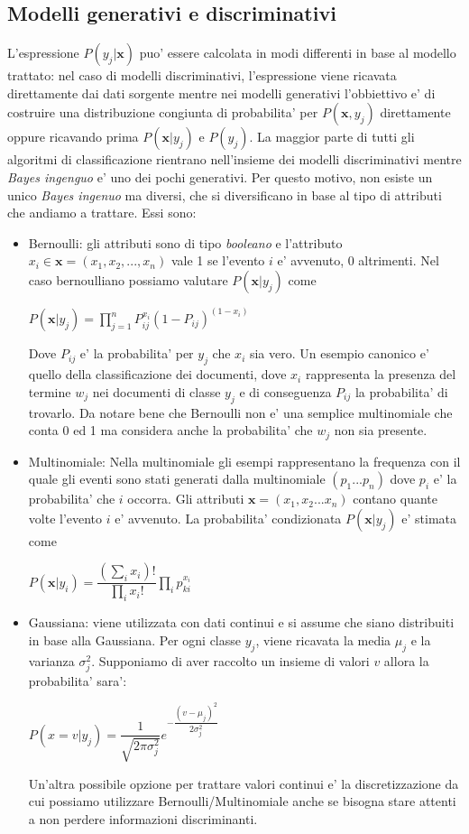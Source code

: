 \subsection*{Modelli generativi e discriminativi}
L'espressione $P(y_j|\textbf{x})$ puo' essere calcolata in modi differenti in base al modello trattato: nel caso di modelli discriminativi, l'espressione viene ricavata direttamente dai dati sorgente mentre nei modelli generativi l'obbiettivo e' di costruire una distribuzione congiunta di probabilita' per $P(\textbf{x}, y_j)$ direttamente oppure ricavando prima $P(\textbf{x}| y_j)$ e $P(y_j)$. La maggior parte di tutti gli algoritmi di classificazione rientrano nell'insieme dei modelli discriminativi mentre \textit{Bayes ingenguo} e' uno dei pochi generativi. Per questo motivo, non esiste un unico \textit{Bayes ingenuo} ma diversi, che si diversificano in base al tipo di attributi che andiamo a trattare. Essi sono:
\begin{itemize}
	\item Bernoulli: gli attributi sono di tipo \textit{booleano} e l'attributo $x_i \in \textbf{x}=(x_1,x_2,...,x_n)$ vale 1 se l'evento $i$ e' avvenuto, 0 altrimenti. Nel caso bernoulliano possiamo valutare $P(\textbf{x}|y_j)$ come
	\begin{center}
	 $P(\textbf{x}|y_j) = \prod_{j=1}^{n} P_{ij}^{x_i} (1-P_{ij})^{(1-x_i)}$
	\end{center}
	Dove $P_{ij}$ e' la probabilita' per $y_j$ che $x_i$ sia vero. Un esempio canonico e' quello della classificazione dei documenti, dove $x_i$ rappresenta la presenza del termine $w_j$ nei documenti di classe $y_j$ e di conseguenza $P_{ij}$ la probabilita' di trovarlo. Da notare bene che Bernoulli non e' una semplice multinomiale che conta 0 ed 1 ma considera anche la probabilita' che $w_j$ non sia presente.
	

	\item Multinomiale: Nella multinomiale gli esempi rappresentano la frequenza con il quale gli eventi sono stati generati dalla multinomiale $(p_1...p_n)$ dove $p_i$ e' la probabilita' che $i$ occorra. Gli attributi $\textbf{x}=(x_1,x_2...x_n)$ contano quante volte l'evento $i$ e' avvenuto. La probabilita' condizionata  $P(\textbf{x}|y_j)$ e' stimata come
	\begin{center}
		$P(\textbf{x}|y_i) = \dfrac{(\sum_{i}x_i)!}{\prod_{i}x_i!}\prod_i p_{ki}^{x_i}$
	\end{center}
	\item Gaussiana: viene utilizzata con dati continui e si assume che siano distribuiti in base alla Gaussiana. Per ogni classe $y_j$, viene ricavata la media $\mu_j$ e la varianza $\sigma_{j}^{2}$. Supponiamo di aver raccolto un insieme di valori $v$ allora la probabilita' sara':
	\begin{center}
		$P(x =v | y_j) = \dfrac{1}{\sqrt{2 \pi \sigma_{j}^2}} e^{-\dfrac{(v - \mu_j)^2}{2 \sigma_{j}^2}}$
	\end{center}
	Un'altra possibile opzione per trattare valori continui e' la discretizzazione da cui possiamo utilizzare Bernoulli/Multinomiale anche se bisogna stare attenti a non perdere informazioni discriminanti.
\end{itemize}

